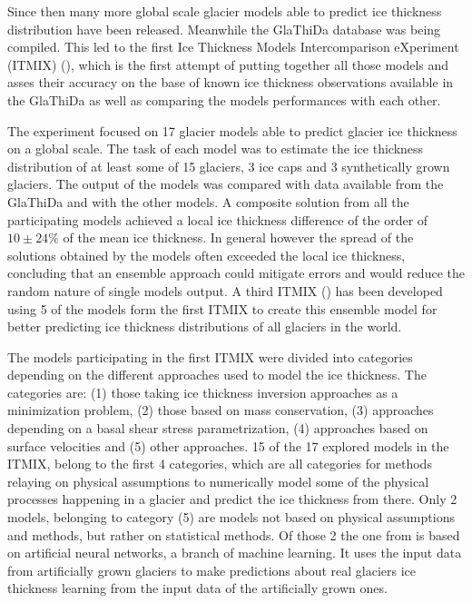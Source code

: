 Since then many more global scale glacier models able to predict ice thickness distribution have been released. Meanwhile the GlaThiDa database was being compiled. This led to the first Ice Thickness Models Intercomparison eXperiment (ITMIX) (\citet{Farinotti2017}), which is the first attempt of putting together all those models and asses their accuracy on the base of known ice thickness observations available in the GlaThiDa as well as comparing the models performances with each other. 

The experiment focused on 17 glacier models able to predict glacier ice thickness on a global scale. The task of each model was to estimate the ice thickness distribution of at least some of 15 glaciers, 3 ice caps and 3 synthetically grown glaciers. The output of the models was compared with data available from the GlaThiDa and with the other models. A composite solution from all the participating models achieved a local ice thickness difference of the order of $10 \pm 24\%$ of the mean ice thickness. In general however the spread of the solutions obtained by the models often exceeded the local ice thickness, concluding that an ensemble approach could mitigate errors and would reduce the random nature of single models output. A third ITMIX (\citet{Farinotti2019}) has been developed using 5 of the models form the first ITMIX to create this ensemble model for better predicting ice thickness distributions of all glaciers in the world.  

The models participating in the first ITMIX were divided into categories depending on the different approaches used to model the ice thickness. The categories are: (1) those taking ice thickness inversion approaches as a minimization problem, (2) those based on mass conservation,  (3) approaches depending on a basal shear stress parametrization, (4) approaches based on surface velocities and (5) other approaches. 15 of the 17 explored models in the ITMIX, belong to the first 4 categories, which are all categories for methods relaying on physical assumptions to numerically model some of the physical processes happening in a glacier and predict the ice thickness from there. Only 2 models, belonging to category (5) are models not based on physical assumptions and methods, but rather on statistical methods. Of those 2 the one from \citet{Clarke2009} is based on artificial neural networks, a branch of machine learning. It uses the input data from artificially grown glaciers to make predictions about real glaciers ice thickness learning from the input data of the artificially grown ones.

